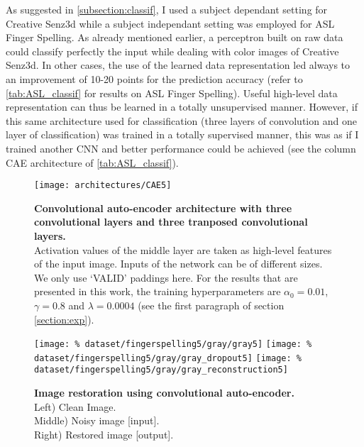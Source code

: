As suggested in \ref{subsection:classif}, I used a subject dependant setting
for Creative Senz3d while a subject independant setting was employed
for ASL Finger Spelling. As already mentioned earlier, a perceptron built
on raw data could classify perfectly the input while dealing with color
images of Creative Senz3d. In other cases, the use of the learned
data representation led always to an improvement of 10-20 points for
the prediction accuracy (refer to \autoref{tab:ASL_classif}
for results on ASL Finger Spelling). Useful high-level data representation
can thus be learned in a totally unsupervised manner.
However, if this same architecture used for classification (three layers
of convolution and one layer of classification) was trained in a
totally supervised manner, this was as if I trained another CNN and
better performance could be achieved (see the column CAE architecture
of \autoref{tab:ASL_classif}).

\vspace{-1em}
\begin{figure}[H]
  \centering
  \texttt{[image: architectures/CAE5]}
  \caption{%
    \textbf{Convolutional auto-encoder architecture with 
      three convolutional layers and three tranposed convolutional
      layers.}\\[0.1em]
    Activation values of the middle layer are taken as 
      high-level features of the input image. Inputs of the network
      can be of different sizes. We only use `VALID' paddings here.
      For the results that are presented in this work, the training
      hyperparameters are $\alpha_0 = 0.01$, $\gamma = 0.8$ and
      $\lambda = 0.0004$ (see the first paragraph of section
      \ref{section:exp}).
      }
  \label{fig:CAE5}
\end{figure}

\begin{figure}[H]
  \centering
  \hfill
  \texttt{[image: \%
    dataset/fingerspelling5/gray/gray5]}
  \hfill
  \texttt{[image: \%
    dataset/fingerspelling5/gray/gray\_dropout5]}
  \hfill
  \texttt{[image: \%
    dataset/fingerspelling5/gray/gray\_reconstruction5]}
  \caption{%
    \textbf{Image restoration using convolutional auto-encoder.}\\[0.1em]
      Left) Clean Image.\\[0.1em]
      Middle) Noisy image [input].\\[0.1em]
      Right) Restored image [output].}
  \label{fig:image_restoration}
\end{figure}

